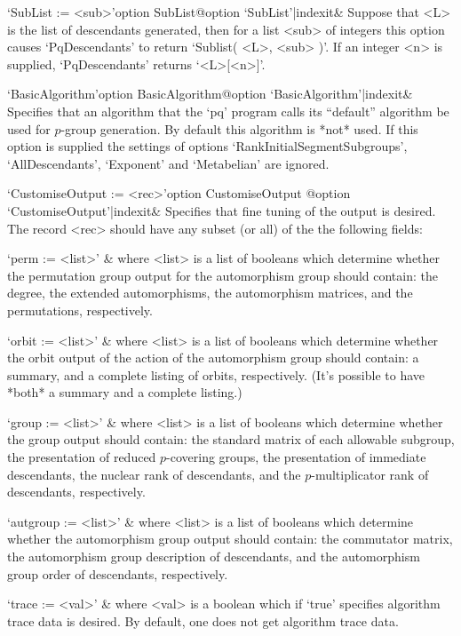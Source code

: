 \>`SubList := <sub>'{option SubList}@{option `SubList'|indexit}&
Suppose that <L> is the list of descendants generated, then  for  a  list
<sub> of integers this option causes `PqDescendants' to return  `Sublist(
<L>, <sub> )'. If an integer <n>  is  supplied,  `PqDescendants'  returns
`<L>[<n>]'.

\>`BasicAlgorithm'{option BasicAlgorithm}@{option `BasicAlgorithm'|indexit}&
Specifies that an  algorithm that the `pq' program  calls its ``default''
algorithm be  used for $p$-group generation. By default this algorithm is
*not*  used.   If  this  option  is  supplied  the  settings  of  options
`RankInitialSegmentSubgroups',     `AllDescendants',    `Exponent'    and
`Metabelian' are ignored.

\>`CustomiseOutput := <rec>'{option CustomiseOutput}%
@{option `CustomiseOutput'|indexit}&
Specifies that fine tuning of the output is  desired.  The  record  <rec>
should have any subset (or all) of the the following fields:

\quad`perm := <list>' &
where  <list>  is  a  list  of  booleans  which  determine  whether   the
permutation group output for the automorphism group should  contain:  the
degree, the extended automorphisms, the automorphism  matrices,  and  the
permutations, respectively.

\quad`orbit := <list>' &
where <list> is a list of booleans  which  determine  whether  the  orbit
output of the action of the automorphism group should contain: a summary,
and a complete listing of orbits, respectively. (It's  possible  to  have
*both* a summary and a complete listing.)

\quad`group := <list>' &
where <list> is a list of booleans  which  determine  whether  the  group
output should contain: the standard matrix of  each  allowable  subgroup,
the presentation of reduced  $p$-covering  groups,  the  presentation  of
immediate  descendants,  the  nuclear  rank  of  descendants,   and   the
$p$-multiplicator rank of descendants, respectively.

\quad`autgroup := <list>' &
where  <list>  is  a  list  of  booleans  which  determine  whether   the
automorphism group output should  contain:  the  commutator  matrix,  the
automorphism group description of descendants, and the automorphism group
order of descendants, respectively.

\quad`trace := <val>' &
where <val> is a boolean which if `true' specifies algorithm  trace  data
is desired. By default, one does not get algorithm trace data.

